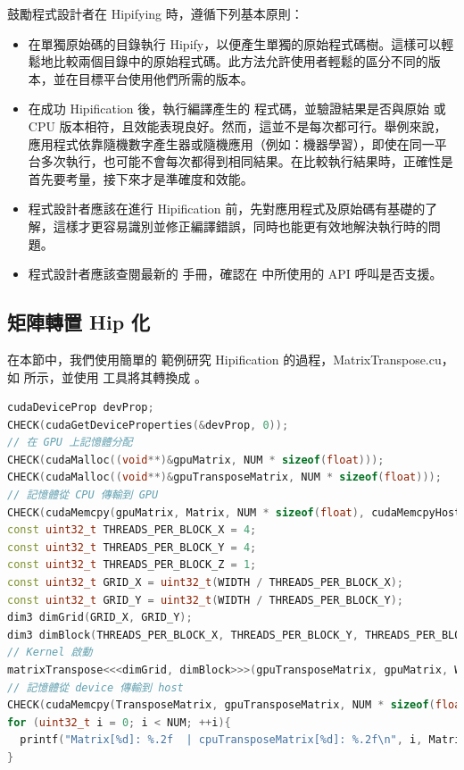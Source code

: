 鼓勵程式設計者在 Hipifying  時，遵循下列基本原則：
\begin{itemize}
    \item 在單獨原始碼的目錄執行 Hipify，以便產生單獨的原始程式碼樹。這樣可以輕鬆地比較兩個目錄中的原始程式碼。此方法允許使用者輕鬆的區分不同的版本，並在目標平台使用他們所需的版本。
    \item 在成功 Hipification 後，執行編譯產生的  程式碼，並驗證結果是否與原始  或 CPU 版本相符，且效能表現良好。然而，這並不是每次都可行。舉例來說，應用程式依靠隨機數字產生器或隨機應用（例如：機器學習），即使在同一平台多次執行，也可能不會每次都得到相同結果。在比較執行結果時，正確性是首先要考量，接下來才是準確度和效能。
    \item 程式設計者應該在進行 Hipification 前，先對應用程式及原始碼有基礎的了解，這樣才更容易識別並修正編譯錯誤，同時也能更有效地解決執行時的問題。
    \item 程式設計者應該查閱最新的  手冊\cite{amd2021hip-supported-api}，確認在  中所使用的 API 呼叫是否支援。
\end{itemize}

\subsection{矩陣轉置 Hip 化}

在本節中，我們使用簡單的  範例研究 Hipification 的過程，MatrixTranspose.cu，如  所示，並使用  工具將其轉換成 。

\begin{lstlisting}[language=C++, caption={CUDA 矩陣轉置的範例片段}, label={lst:CUDA matrix-transpose example snippet}]
cudaDeviceProp devProp;
CHECK(cudaGetDeviceProperties(&devProp, 0));
// 在 GPU 上記憶體分配
CHECK(cudaMalloc((void**)&gpuMatrix, NUM * sizeof(float)));
CHECK(cudaMalloc((void**)&gpuTransposeMatrix, NUM * sizeof(float)));
// 記憶體從 CPU 傳輸到 GPU
CHECK(cudaMemcpy(gpuMatrix, Matrix, NUM * sizeof(float), cudaMemcpyHostToDevice));
const uint32_t THREADS_PER_BLOCK_X = 4;
const uint32_t THREADS_PER_BLOCK_Y = 4;
const uint32_t THREADS_PER_BLOCK_Z = 1;
const uint32_t GRID_X = uint32_t(WIDTH / THREADS_PER_BLOCK_X);
const uint32_t GRID_Y = uint32_t(WIDTH / THREADS_PER_BLOCK_Y);
dim3 dimGrid(GRID_X, GRID_Y);
dim3 dimBlock(THREADS_PER_BLOCK_X, THREADS_PER_BLOCK_Y, THREADS_PER_BLOCK_Z);
// Kernel 啟動
matrixTranspose<<<dimGrid, dimBlock>>>(gpuTransposeMatrix, gpuMatrix, WIDTH);
// 記憶體從 device 傳輸到 host
CHECK(cudaMemcpy(TransposeMatrix, gpuTransposeMatrix, NUM * sizeof(float), cudaMemcpyDeviceToHost));
for (uint32_t i = 0; i < NUM; ++i){
  printf("Matrix[%d]: %.2f  | cpuTransposeMatrix[%d]: %.2f\n", i, Matrix[i], i, cpuTransposeMatrix[i]);
}
\end{lstlisting}

